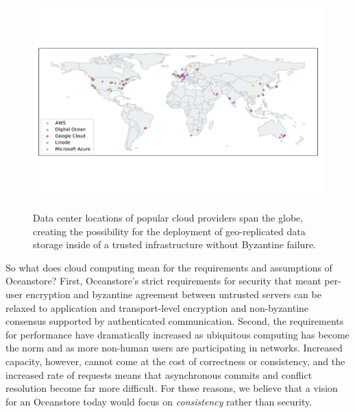 \begin{figure}
    \begin{center}
        \includegraphics[width=5in]{figures/ch01_cloud_data_centers.pdf}
    \end{center}
    \renewcommand{\baselinestretch}{1}
    \small\normalsize

    \begin{quote}
        \caption[Global Data Centers of Cloud Providers]{Data center locations of popular cloud providers span the globe, creating the possibility for the deployment of geo-replicated data storage inside of a trusted infrastructure without Byzantine failure.}
        \label{fig:ch01_cloud_data_centers}
    \end{quote}
\end{figure}
\renewcommand{\baselinestretch}{2}
\small\normalsize

So what does cloud computing mean for the requirements and assumptions of Oceanstore?
First, Oceanstore's strict requirements for security that meant per-user encryption and byzantine agreement between untrusted servers can be relaxed to application and transport-level encryption and non-byzantine consensus supported by authenticated communication.
Second, the requirements for performance have dramatically increased as ubiquitous computing has become the norm and as more non-human users are participating in networks.
Increased capacity, however, cannot come at the cost of correctness or consistency, and the increased rate of requests means that asynchronous commits and conflict resolution become far more difficult.
For these reasons, we believe that a vision for an Oceanstore today would focus on \emph{consistency} rather than security.

